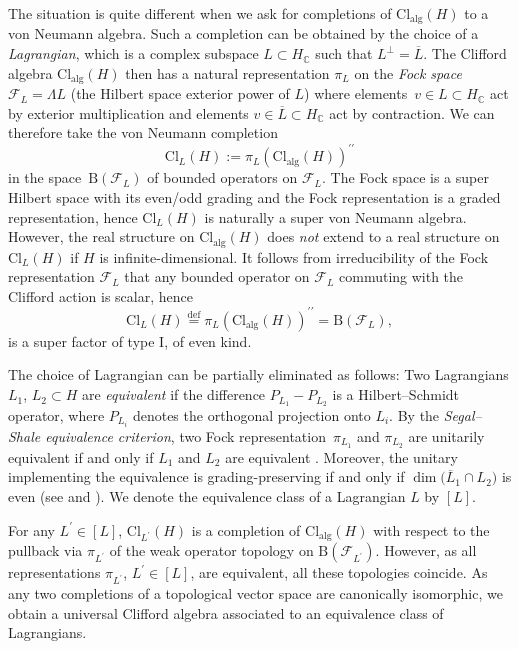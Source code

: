 \documentclass[11pt]{article}
\numberwithin{equation}{section}
\numberwithin{equation}{section}
\newcommand{\C}{\mathbb{C}}
\newcommand{\B}{\mathrm{B}}
\newcommand{\Cl}{\mathrm{Cl}}
\begin{document}
The situation is quite different when we ask for completions of $\Cl_{\mathrm{alg}}(H)$ to a von Neumann algebra.
Such a completion can be obtained by the choice of a \emph{Lagrangian}, which is a complex subspace $L \subset H_\C$ such that $L^\perp = \overline{L}$.
The Clifford algebra $\Cl_{\mathrm{alg}}(H)$ then has a natural representation $\pi_L$ on the \emph{Fock space} $\mathcal{F}_L = \Lambda L$ (the Hilbert space exterior power of $L$) where elements~$v \in L \subset H_\C$ act by exterior multiplication and elements $v \in \overline{L} \subset H_\C$ act by contraction. We can therefore take the von Neumann completion
\[\Cl_L(H) := \pi_L(\Cl_{\mathrm{alg}}(H))^{\prime\prime}\]
 in the space~$\B(\mathcal{F}_L)$ of bounded operators on $\mathcal{F}_L$.
The Fock space is a super Hilbert space with its even/odd grading and the Fock representation is a graded representation, hence $\Cl_L(H)$ is naturally a super von Neumann algebra.
However, the real structure on $\Cl_{\mathrm{alg}}(H)$ does \emph{not} extend to a real structure on $\Cl_L(H)$ if $H$ is infinite-dimensional. It follows from irreducibility of the Fock representation $\mathcal{F}_L$ \cite[Theorem~2.4.2]{PlymenRobinson} that any bounded operator on $\mathcal{F}_L$ commuting with the Clifford action is scalar, hence
\begin{equation}
\label{IdentificationWithBH}
 \Cl_L(H)  \stackrel{\mathrm{def}}{=}  \pi_L(\Cl_{\mathrm{alg}}(H))^{\prime\prime} = \B(\mathcal{F}_L),
\end{equation}
is a super factor of type I, of even kind.

The choice of Lagrangian can be partially eliminated as follows:
Two Lagrangians $L_1$, $L_2 \subset H$ are \emph{equivalent} if the difference $P_{L_1} - P_{L_2}$ is a Hilbert--Schmidt operator, where $P_{L_i}$ denotes the orthogonal projection onto $L_i$.
By the \emph{Segal--Shale equivalence criterion}, two Fock representation~$\pi_{L_1}$ and $\pi_{L_2}$ are unitarily equivalent if and only if $L_1$ and $L_2$ are equivalent \cite[Theorem~3.4.1]{PlymenRobinson}.
Moreover, the unitary implementing the equivalence is grading-preserving if and only if $\dim\big(\overline{L}_1 \cap L_2\big)$ is even (see \cite[Theorem~1.22]{PratWaldron} and \cite[Theorem~3.5.1]{PlymenRobinson}).
We denote the equivalence class of a Lagrangian $L$ by $[L]$.

For any $L^\prime \in [L]$, $\Cl_{L^\prime}(H)$ is a completion of $\Cl_{\mathrm{alg}}(H)$ with respect to the pullback via $\pi_{L^\prime}$ of the weak operator topology on $\B(\mathcal{F}_{L^\prime})$.
However, as all representations $\pi_{L^\prime}$, $L^\prime \in [L]$, are equivalent, all these topologies coincide. As any two completions of a topological vector space are canonically isomorphic, we obtain a universal Clifford algebra associated to an equivalence class of Lagrangians.
\end{document}
